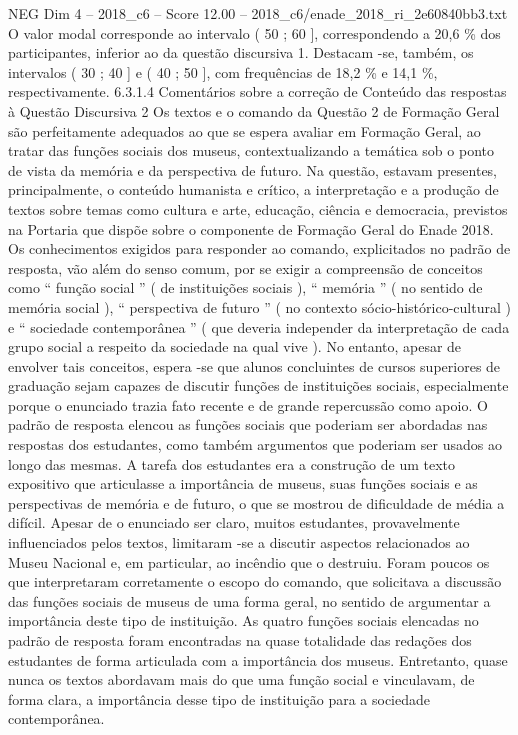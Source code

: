 \begin{textsample}{NEG Dim 4 – 2018\_c6 – Score 12.00 – 2018\_c6/enade\_2018\_ri\_2e60840bb3.txt}
O valor modal corresponde ao intervalo ( 50 ; 60 ], correspondendo a 20,6 \% dos participantes, inferior ao da questão discursiva 1.
Destacam -se, também, os intervalos ( 30 ; 40 ] e ( 40 ; 50 ], com frequências de 18,2 \% e 14,1 \%, respectivamente. 6.3.1.4 Comentários sobre a correção de Conteúdo das respostas à Questão Discursiva 2 Os textos e o comando da Questão 2 de Formação Geral são perfeitamente adequados ao que se espera avaliar em Formação Geral, ao tratar das funções sociais dos museus, contextualizando a temática sob o ponto de vista da memória e da perspectiva de futuro.
Na questão, estavam presentes, principalmente, o conteúdo humanista e crítico, a interpretação e a produção de textos sobre temas como cultura e arte, educação, ciência e democracia, previstos na Portaria que dispõe sobre o componente de Formação Geral do Enade 2018.
Os conhecimentos exigidos para responder ao comando, explicitados no padrão de resposta, vão além do senso comum, por se exigir a compreensão de conceitos como “ função social ” ( de instituições sociais ), “ memória ” ( no sentido de memória social ), “ perspectiva de futuro ” ( no contexto sócio-histórico-cultural ) e “ sociedade contemporânea ” ( que deveria independer da interpretação de cada grupo social a respeito da sociedade na qual vive ).
No entanto, apesar de envolver tais conceitos, espera -se que alunos concluintes de cursos superiores de graduação sejam capazes de discutir funções de instituições sociais, especialmente porque o enunciado trazia fato recente e de grande repercussão como apoio.
O padrão de resposta elencou as funções sociais que poderiam ser abordadas nas respostas dos estudantes, como também argumentos que poderiam ser usados ao longo das mesmas.
A tarefa dos estudantes era a construção de um texto expositivo que articulasse a importância de museus, suas funções sociais e as perspectivas de memória e de futuro, o que se mostrou de dificuldade de média a difícil.
Apesar de o enunciado ser claro, muitos estudantes, provavelmente influenciados pelos textos, limitaram -se a discutir aspectos relacionados ao Museu Nacional e, em particular, ao incêndio que o destruiu.
Foram poucos os que interpretaram corretamente o escopo do comando, que solicitava a discussão das funções sociais de museus de uma forma geral, no sentido de argumentar a importância deste tipo de instituição.
As quatro funções sociais elencadas no padrão de resposta foram encontradas na quase totalidade das redações dos estudantes de forma articulada com a importância dos museus.
Entretanto, quase nunca os textos abordavam mais do que uma função social e vinculavam, de forma clara, a importância desse tipo de instituição para a sociedade contemporânea.

\end{textsample}
